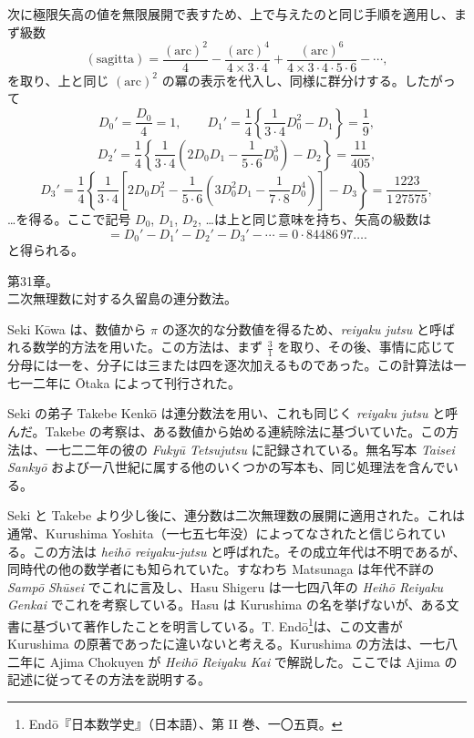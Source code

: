 \documentclass[11pt]{article}
\newcommand{\scanpage}[2]{\clearpage\setcounter{footnote}{0}\noindent{\footnotesize\color{gray}PDF #1 頁 · #2}\par\medskip}
\newcommand{\scanfooter}{}
\newcommand{\dd}{\mathbin{\cdot}}
\begin{document}
次に極限矢高の値を無限展開で表すため、上で与えたのと同じ手順を適用し、まず級数
\[
(\mathrm{sagitta})=\frac{(\mathrm{arc})^2}{4}-\frac{(\mathrm{arc})^4}{4\times3\dd4}+\frac{(\mathrm{arc})^6}{4\times3\dd4\dd5\dd6}-\cdots,
\]
を取り、上と同じ $(\mathrm{arc})^2$ の冪の表示を代入し、同様に群分けする。したがって
\[
D_0'=\frac{D_0}{4}=1,
\qquad
D_1'=\frac14\left\{\frac1{3\dd4}D_0^2-D_1\right\}=\frac19,
\]
\[
D_2'=\frac14\left\{\frac1{3\dd4}\left(2D_0D_1-\frac1{5\dd6}D_0^3\right)-D_2\right\}=\frac{11}{405},
\]
\[
D_3'=\frac14\left\{\frac1{3\dd4}\left[2D_0D_1^2-\frac1{5\dd6}\left(3D_0^2D_1-\frac1{7\dd8}D_0^4\right)\right]-D_3\right\}=\frac{1223}{1\,27575},
\]
\ldots を得る。ここで記号 $D_0$, $D_1$, $D_2$, \ldots は上と同じ意味を持ち、矢高の級数は
\[
=D_0'-D_1'-D_2'-D_3'-\cdots=0\dd84486\,97\ldots.
\]
と得られる。
\scanfooter


\scanpage{0237}{第31章冒頭、印刷頁223}
\begin{center}
第31章。\\[1mm]
二次無理数に対する久留島の連分数法。
\end{center}

Seki Kōwa は、数値から $\pi$ の逐次的な分数値を得るため、\emph{reiyaku jutsu} と呼ばれる数学的方法を用いた。この方法は、まず $\frac31$ を取り、その後、事情に応じて分母には一を、分子には三または四を逐次加えるものであった。この計算法は一七一二年に Ōtaka によって刊行された。

Seki の弟子 Takebe Kenkō は連分数法を用い、これも同じく \emph{reiyaku jutsu} と呼んだ。Takebe の考察は、ある数値から始める連続除法に基づいていた。この方法は、一七二二年の彼の \emph{Fukyū Tetsujutsu} に記録されている。無名写本 \emph{Taisei Sankyō} および一八世紀に属する他のいくつかの写本も、同じ処理法を含んでいる。

Seki と Takebe より少し後に、連分数は二次無理数の展開に適用された。これは通常、Kurushima Yoshita（一七五七年没）によってなされたと信じられている。この方法は \emph{heihō reiyaku-jutsu} と呼ばれた。その成立年代は不明であるが、同時代の他の数学者にも知られていた。すなわち Matsunaga は年代不詳の \emph{Sampō Shūsei} でこれに言及し、Hasu Shigeru は一七四八年の \emph{Heihō Reiyaku Genkai} でこれを考察している。Hasu は Kurushima の名を挙げないが、ある文書に基づいて著作したことを明言している。T. Endō\footnote{Endō『日本数学史』（日本語）、第 II 巻、一〇五頁。}は、この文書が Kurushima の原著であったに違いないと考える。Kurushima の方法は、一七八二年に Ajima Chokuyen が \emph{Heihō Reiyaku Kai} で解説した。ここでは Ajima の記述に従ってその方法を説明する。
\end{document}
